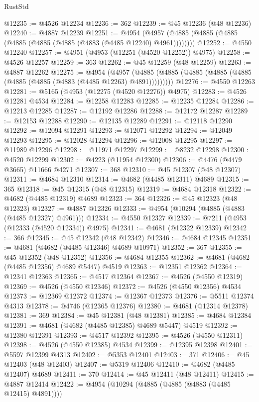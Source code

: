 \begin{lexlean}{RustStd}
\begin{coremodule}
@12235 := @4526 @12234
@12236 := 362
@12239 := @45 @12236 (@48 @12236)
@12240 := @4887 @12239
@12251 := @4954 (@4957 (@4885 (@4885 (@4885 (@4885 (@4885 (@4885 (@4883 (@4485 @12240) @4961))))))))
@12252 := @4550 @12240
@12257 := @4951 (@4953 (@12251 (@4520 @12252)) @4975)
@12258 := @4526 @12257
@12259 := 363
@12262 := @45 @12259 (@48 @12259)
@12263 := @4887 @12262
@12275 := @4954
    (@4957 (@4885 (@4885 (@4885 (@4885 (@4885 (@4885 (@4885 (@4883 (@4485 @12263) @4891)))))))))
@12276 := @4550 @12263
@12281 := @5165 (@4953 (@12275 (@4520 @12276)) @4975)
@12283 := @4526 @12281 @4534
@12284 := @12258 @12283
@12285 := @12235 @12284
@12286 := @12213 @12285
@12287 := @12192 @12286
@12288 := @12172 @12287
@12289 := @12153 @12288
@12290 := @12135 @12289
@12291 := @12118 @12290
@12292 := @12094 @12291
@12293 := @12071 @12292
@12294 := @12049 @12293
@12295 := @12028 @12294
@12296 := @12008 @12295
@12297 := @11989 @12296
@12298 := @11971 @12297
@12299 := @8232 @12298
@12300 := @4520 @12299
@12302 := @4223 (@11954 @12300)
@12306 := @4476 (@4479 @3665) @11666 @4271
@12307 := 368
@12310 := @45 @12307 (@48 @12307)
@12311 := @4684 @12310
@12314 := @4682 (@4485 @12311) @4689
@12315 := 365
@12318 := @45 @12315 (@48 @12315)
@12319 := @4684 @12318
@12322 := @4682 (@4485 @12319) @4689
@12323 := 364
@12326 := @45 @12323 (@48 @12323)
@12327 := @4887 @12326
@12333 := @4954 (@10294 (@4885 (@4883 (@4485 @12327) @4961)))
@12334 := @4550 @12327
@12339 := @7211 (@4953 (@12333 (@4520 @12334)) @4975)
@12341 := @4681 (@12322 @12339)
@12342 := 366
@12345 := @45 @12342 (@48 @12342)
@12346 := @4684 @12345
@12351 := @4681 (@4682 (@4485 @12346) @4689 @10971)
@12352 := 367
@12355 := @45 @12352 (@48 @12352)
@12356 := @4684 @12355
@12362 := @4681 (@4682 (@4485 @12356) @4689 @5447) @4519
@12363 := @12351 @12362
@12364 := @12341 @12363
@12365 := @4517 @12364
@12367 := @4526 (@4550 @12319)
@12369 := @4526 (@4550 @12346)
@12372 := @4526 (@4550 @12356) @4534
@12373 := @12369 @12372
@12374 := @12367 @12373
@12376 := @5511 @12374 @4313
@12378 := @4746 (@12365 @12376)
@12380 := @4681 (@12314 @12378)
@12381 := 369
@12384 := @45 @12381 (@48 @12381)
@12385 := @4684 @12384
@12391 := @4681 (@4682 (@4485 @12385) @4689 @5447) @4519
@12392 := @12380 @12391
@12393 := @4517 @12392
@12395 := @4526 (@4550 @12311)
@12398 := @4526 (@4550 @12385) @4534
@12399 := @12395 @12398
@12401 := @5597 @12399 @4313
@12402 := @5353 @12401
@12403 := 371
@12406 := @45 @12403 (@48 @12403)
@12407 := @5319 @12406
@12410 := @4682 (@4485 @12407) @4689
@12411 := 370
@12414 := @45 @12411 (@48 @12411)
@12415 := @4887 @12414
@12422 := @4954 (@10294 (@4885 (@4885 (@4883 (@4485 @12415) @4891))))

\end{coremodule}
\end{lexlean}

